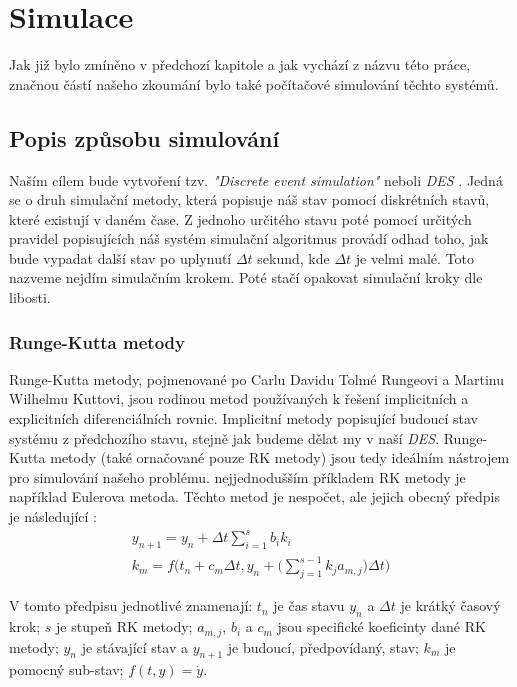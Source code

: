 \chapter{Simulace}
\label{chap:sim}

Jak již bylo zmíněno v předchozí kapitole a jak vychází z názvu této práce, značnou částí našeho zkoumání bylo také počítačové simulování těchto systémů.

\section{Popis způsobu simulování}

Naším cílem bude vytvoření tzv. \textit{"Discrete event simulation"} neboli \textit{DES} \cite{sim_methods}. Jedná se o druh simulační metody, která popisuje náš stav pomocí diskrétních stavů, které existují v daném čase. Z jednoho určitého stavu poté pomocí určitých pravidel popisujících náš systém simulační algoritmus provádí odhad toho, jak bude vypadat další stav po uplynutí $\Delta t$ sekund, kde $\Delta t$ je velmi malé. Toto nazveme nejdím simulačním krokem. Poté stačí opakovat simulační kroky dle libosti.

\subsection{Runge-Kutta metody}

Runge-Kutta metody, pojmenované po Carlu Davidu Tolmé Rungeovi a Martinu Wilhelmu Kuttovi, jsou rodinou metod používaných k řešení implicitních a explicitních diferenciálních rovnic. Implicitní metody popisující budoucí stav systému z předchozího stavu, stejně jak budeme dělat my v naší \textit{DES}. Runge-Kutta metody (také ornačované pouze RK metody) jsou tedy ideálním nástrojem pro simulování našeho problému. nejjednodušším příkladem RK metody je například Eulerova metoda. Těchto metod je nespočet, ale jejich obecný předpis je následující \cite{RK_def}:
\begin{equation}
    \label{eq:RK_def}
    \begin{gathered}
        y_{n+1} = y_n + \Delta t \sum_{i=1}^{s} b_i k_i \\
        k_m = f \Bigg(t_n + c_m \Delta t, y_n + \Bigg(\sum_{j=1}^{s-1} k_j a_{m,j} \Bigg) \Delta t \Bigg)
    \end{gathered}
\end{equation}

V tomto předpisu jednotlivé znamenají: $t_n$ je čas stavu $y_n$ a $\Delta t$ je krátký časový krok; $s$ je stupeň RK metody; $a_{m,j}$, $b_i$ a $c_m$ jsou specifické koeficinty dané RK metody; $y_n$ je stávající stav a $y_{n+1}$ je budoucí, předpovídaný, stav; $k_m$ je pomocný sub-stav; $f(t,y) = \dot{y}$.

